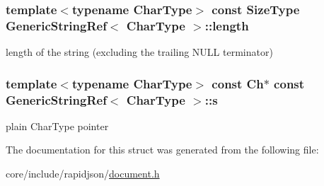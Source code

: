 \subsubsection[{\texorpdfstring{length}{length}}]{\setlength{\rightskip}{0pt plus 5cm}template$<$typename Char\+Type$>$ const {\bf Size\+Type} {\bf Generic\+String\+Ref}$<$ Char\+Type $>$\+::length}\hypertarget{structGenericStringRef_a4a96d618744ad73f766a1551b1d517fe}{}\label{structGenericStringRef_a4a96d618744ad73f766a1551b1d517fe}


length of the string (excluding the trailing N\+U\+LL terminator) 

\subsubsection[{\texorpdfstring{s}{s}}]{\setlength{\rightskip}{0pt plus 5cm}template$<$typename Char\+Type$>$ const {\bf Ch}$\ast$ const {\bf Generic\+String\+Ref}$<$ Char\+Type $>$\+::s}\hypertarget{structGenericStringRef_ac555994afd329bc9bc1780acf2f9d9be}{}\label{structGenericStringRef_ac555994afd329bc9bc1780acf2f9d9be}


plain Char\+Type pointer 



The documentation for this struct was generated from the following file\+:\begin{DoxyCompactItemize}
\item 
core/include/rapidjson/\hyperlink{document_8h}{document.\+h}\end{DoxyCompactItemize}
